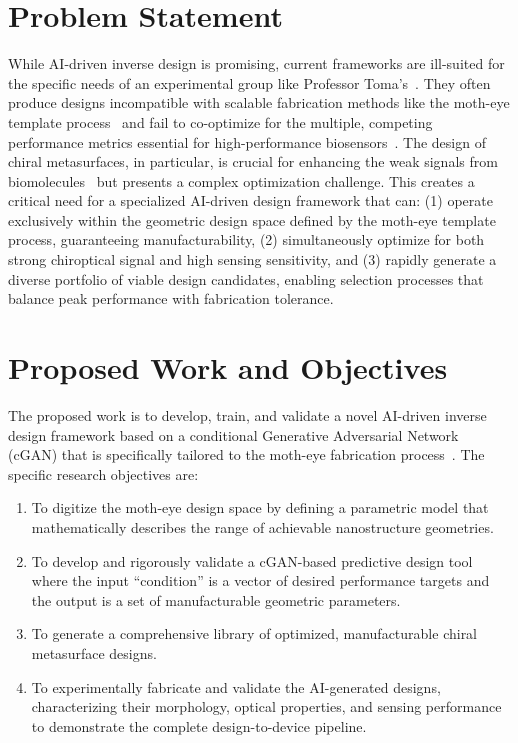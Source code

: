 \documentclass[12pt,a4paper]{article}
\begin{document}
\section{Problem Statement}
While AI-driven inverse design is promising, current frameworks are ill-suited for the specific needs of an experimental group like Professor Toma's~\cite{dl_nanophotonics_researching,nanophotonic_biosensors_review}. They often produce designs incompatible with scalable fabrication methods like the moth-eye template process~\cite{nil_metasurface_review} and fail to co-optimize for the multiple, competing performance metrics essential for high-performance biosensors~\cite{ml_metaplasmonic_biosensors}. The design of chiral metasurfaces, in particular, is crucial for enhancing the weak signals from biomolecules~\cite{nn_chiral_nanodimer,inverse_chiroptical_response} but presents a complex optimization challenge. This creates a critical need for a specialized AI-driven design framework that can: (1) operate exclusively within the geometric design space defined by the moth-eye template process, guaranteeing manufacturability, (2) simultaneously optimize for both strong chiroptical signal and high sensing sensitivity, and (3) rapidly generate a diverse portfolio of viable design candidates, enabling selection processes that balance peak performance with fabrication tolerance.

\section{Proposed Work and Objectives}
The proposed work is to develop, train, and validate a novel AI-driven inverse design framework based on a conditional Generative Adversarial Network (cGAN) that is specifically tailored to the moth-eye fabrication process~\cite{dl_nanophotonics_rg}. The specific research objectives are:

\begin{enumerate}
  \item To digitize the moth-eye design space by defining a parametric model that mathematically describes the range of achievable nanostructure geometries.
  \item To develop and rigorously validate a cGAN-based predictive design tool where the input ``condition'' is a vector of desired performance targets and the output is a set of manufacturable geometric parameters.
  \item To generate a comprehensive library of optimized, manufacturable chiral metasurface designs.
  \item To experimentally fabricate and validate the AI-generated designs, characterizing their morphology, optical properties, and sensing performance to demonstrate the complete design-to-device pipeline.
\end{enumerate}
\end{document}
